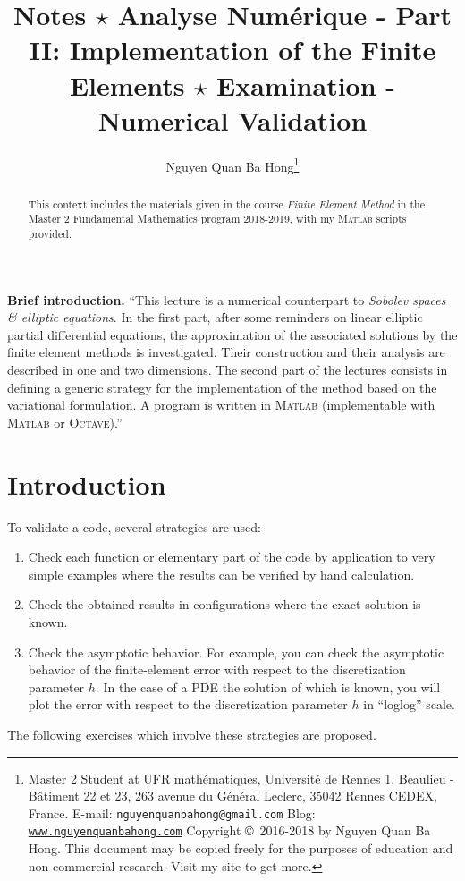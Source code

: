 \documentclass[11pt,a4paper,center,notitlepage]{article}
\title{Notes $\star$ Analyse Num\'erique - Part II: Implementation of the Finite Elements $\star$ Examination - Numerical Validation}
\author{Nguyen Quan Ba Hong\footnote{Master 2 Student at UFR math\'ematiques, Universit\'e de Rennes 1, Beaulieu - B\^atiment 22 et 23, 263 avenue du G\'en\'eral Leclerc, 35042 Rennes CEDEX, France.\newline
E-mail: \texttt{nguyenquanbahong@gmail.com} \newline
Blog: \texttt{\url{www.nguyenquanbahong.com}} \newline 
Copyright \copyright\ 2016-2018 by Nguyen Quan Ba Hong. This document may be copied freely for the purposes of education and non-commercial research. Visit my site to get more.}}
\numberwithin{equation}{section}
\begin{document}
\maketitle
\begin{abstract}
This context includes the materials given in the course \textit{Finite Element Method} in the Master 2 Fundamental Mathematics program 2018-2019, with my \textsc{Matlab} scripts provided.
\end{abstract}
%
\maketitle
\textbf{Brief introduction.} ``This lecture is a numerical counterpart to \textit{Sobolev spaces \& elliptic equations}. In the first part, after some reminders on linear elliptic partial differential equations, the approximation of the associated solutions by the finite element methods is investigated. Their construction and their analysis are described in one and two dimensions. The second part of the lectures consists in defining a generic strategy for the implementation of the method based on the variational formulation. A program is written in \textsc{Matlab} (implementable with \textsc{Matlab} or \textsc{Octave}).''
\newpage
\tableofcontents
\newpage

\section*{Introduction}
To validate a code, several strategies are used:
\begin{enumerate}
\item Check each function or elementary part of the code by application to very simple examples where the results can be verified by hand calculation.
\item Check the obtained results in configurations where the exact solution is known.
\item Check the asymptotic behavior. For example, you can check the asymptotic behavior of the finite-element error with respect to the discretization parameter $h$. In the case of a PDE the solution of which is known, you will plot the error with respect to the discretization parameter $h$ in ``loglog'' scale.
\end{enumerate}
The following exercises which involve these strategies are proposed.
\end{document}
